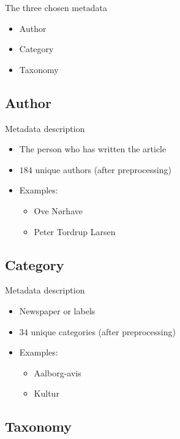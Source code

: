 \begin{frame}{\insertsection}{The three chosen metadata}
	\begin{itemize}
		\item Author
		\item Category
		\item Taxonomy
	\end{itemize}
\end{frame}

\subsection{Author}

\begin{frame}{\insertsubsection}{Metadata description}
	\begin{itemize}
		\item The person who has written the article
		\item $184$ unique authors (after preprocessing)
		\item Examples: 
		\begin{itemize}
			\item Ove Nørhave
			\item Peter Tordrup Larsen
		\end{itemize}
	\end{itemize}
\end{frame}


\subsection{Category}

\begin{frame}{\insertsubsection}{Metadata description}
	\begin{itemize}
		\item Newspaper or labels
		\item $34$ unique categories (after preprocessing)
		\item Examples:
		\begin{itemize}
			\item Aalborg-avis
			\item Kultur
		\end{itemize}
	\end{itemize}
\end{frame}


\subsection{Taxonomy}

